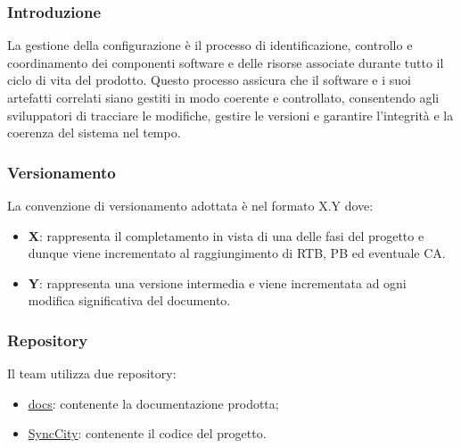 \subsubsection{Introduzione}
La gestione della configurazione è il processo di identificazione, controllo e coordinamento dei componenti software e delle risorse associate durante tutto il ciclo di vita del prodotto. Questo processo assicura che il software e i suoi artefatti correlati siano gestiti in modo coerente e controllato, consentendo agli sviluppatori di tracciare le modifiche, gestire le versioni e garantire l'integrità e la coerenza del sistema nel tempo.
\newpage
\subsubsection{Versionamento}
La convenzione di versionamento adottata è nel formato X.Y dove:
\begin{itemize}
	\item \textbf{X}: rappresenta il completamento in vista di una delle fasi del progetto e dunque viene incrementato al raggiungimento di RTB, PB ed eventuale CA.
	\item \textbf{Y}: rappresenta una versione intermedia e viene incrementata ad ogni modifica significativa del documento.
\end{itemize}

\subsubsection{Repository}
Il team utilizza due repository:
\begin{itemize}
	\item \href{https://github.com/7Last/docs.git}{\underline{docs}}: contenente la documentazione prodotta;
	\item \href{https://github.com/7Last/SyncCity}{\underline{SyncCity}}: contenente il codice del progetto.
\end{itemize}

